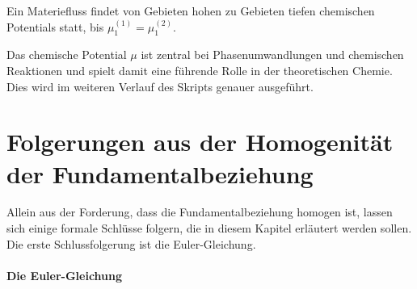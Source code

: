 \begin{formal}
    Ein Materiefluss findet von Gebieten hohen zu Gebieten tiefen chemischen Potentials statt, bis $\mu_1^{(1)} = \mu_1^{(2)}$.
\end{formal}

Das chemische Potential $\mu$ ist zentral bei Phasenumwandlungen und chemischen Reaktionen und spielt damit eine führende Rolle in der theoretischen Chemie. Dies wird im weiteren Verlauf des Skripts genauer ausgeführt.



\section{Folgerungen aus der Homogenität der Fundamentalbeziehung}

Allein aus der Forderung, dass die Fundamentalbeziehung homogen ist, lassen sich einige formale Schlüsse folgern, die in diesem Kapitel erläutert werden sollen. Die erste Schlussfolgerung ist die Euler-Gleichung.

\paragraph*{Die Euler-Gleichung}

